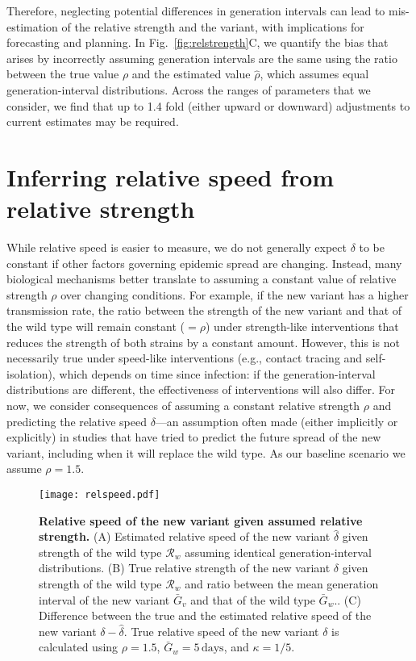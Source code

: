 \documentclass[12pt]{article}
\newcommand{\fref}[1]{Fig.~\ref{fig:#1}}
\newcommand{\RR}{\ensuremath{{\mathcal R}}\xspace}
\begin{document}
Therefore, neglecting potential differences in generation intervals can lead to mis-estimation of the relative strength and the variant, with implications for forecasting and planning.
In \fref{relstrength}C, we quantify the bias that arises by incorrectly assuming generation intervals are the same using the ratio between the true value $\rho$ and the estimated value $\hat{\rho}$, which assumes equal generation-interval distributions.
Across the ranges of parameters that we consider, we find that up to 1.4 fold (either upward or downward) adjustments to current estimates may be required.

\section{Inferring relative speed from relative strength}

While relative speed is easier to measure, we do not generally expect $\delta$ to be constant if other factors governing epidemic spread are changing.
Instead, many biological mechanisms better translate to assuming a constant value of relative strength $\rho$ over changing conditions.
For example, if the new variant has a higher transmission rate, the ratio between the strength of the new variant and that of the wild type will remain constant ($=\rho$) under strength-like interventions that reduces the strength of both strains by a constant amount.
However, this is not necessarily true under speed-like interventions (e.g., contact tracing and self-isolation), which depends on time since infection: if the generation-interval distributions are different, the effectiveness of interventions will also differ.
For now, we consider consequences of assuming a constant relative strength $\rho$ and predicting the relative speed $\delta$---an assumption often made (either implicitly or explicitly) in studies that have tried to predict the future spread of the new variant, including when it will replace the wild type.
As our baseline scenario we assume $\rho = 1.5$.

\begin{figure}[!th]
\texttt{[image: relspeed.pdf]}
\caption{
\textbf{Relative speed of the new variant given assumed relative strength.}
(A) Estimated relative speed of the new variant $\hat{\delta}$ given strength of the wild type $\RR_w$ assuming identical generation-interval distributions.
(B) True relative strength of the new variant $\delta$ given strength of the wild type $\RR_w$ and ratio between the mean generation interval of the new variant $\bar{G}_v$ and that of the wild type $\bar{G}_w$..
(C) Difference between the true and the estimated relative speed of the new variant $\delta - \hat{\delta}$.
True relative speed of the new variant $\delta$ is calculated using $\rho=1.5$, $\bar{G}_w = 5\,\textrm{days}$, and $\kappa=1/5$.
}
\label{fig:relspeed}
\end{figure}
\end{document}
